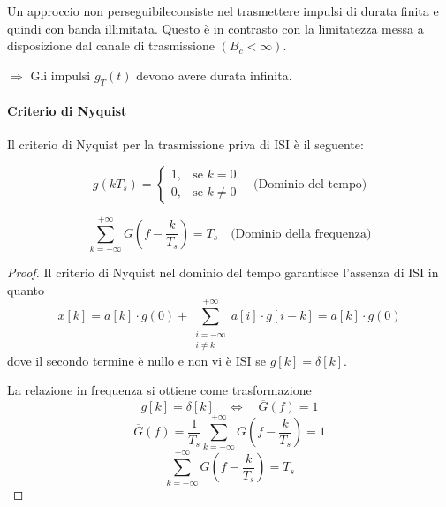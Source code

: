 Un approccio non perseguibileconsiste nel trasmettere impulsi di durata finita e quindi con banda illimitata. Questo è in contrasto con la limitatezza messa a disposizione dal canale di trasmissione \( (B_c < \infty) \).

\(\Rightarrow\) Gli impulsi \( g_T(t) \) devono avere durata infinita.

\paragraph*{Criterio di Nyquist}{Il criterio di Nyquist per la trasmissione priva di ISI è il seguente:}

\[ g(kT_s) =
    \begin{cases}
        1, & \text{se } k=0      \\
        0, & \text{se } k \neq 0
    \end{cases}
    \quad \text{(Dominio del tempo)}
\]

\[ \sum_{k=-\infty}^{+\infty} G\left(f-\frac{k}{T_s}\right) = T_s \quad \text{(Dominio della frequenza)} \]




\begin{proof}
    Il criterio di Nyquist nel dominio del tempo garantisce l'assenza di ISI in quanto
    \[ x[k] = a[k] \cdot g(0) + \sum_{\substack{i=-\infty \\ i \neq k}}^{+\infty} a[i] \cdot g[i-k] = a[k] \cdot g(0) \]
    dove il secondo termine è nullo e non vi è ISI se \( g[k] = \delta[k] \).

    La relazione in frequenza si ottiene come trasformazione
    \[ g[k] = \delta[k] \quad \Longleftrightarrow \quad \overline{G}(f) = 1 \]
    \[ \overline{G}(f) = \frac{1}{T_s} \sum_{k=-\infty}^{+\infty} G\left(f - \frac{k}{T_s}\right) = 1 \]
    \[ \sum_{k=-\infty}^{+\infty} G\left(f - \frac{k}{T_s}\right) = T_s \]
\end{proof}
